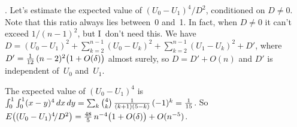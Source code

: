 \bigskip
{}.\quad
Let's estimate the expected value of $(U_0-U_1)^4\!/D^2$, conditioned on $D\neq
0$. Note that this ratio always lies between~0 and~1. In fact, when $D\neq 0$
 it can't exceed $1/(n-1)^2$, but I~don't need this. We have
$D=(U_0-U_1)^2+\sum_{k=2}^{n-1}(U_0-U_k)^2+\sum_{k=2}^{n-1}(U_1-U_k)^2+D'$,
where $D'={1\over 12}\,(n-2)^2\bigl(1+O(\delta)\bigr)$ almost surely, so
$D=D'+O(n)$ and $D'$ is independent of~$U_0$ and~$U_1$.

The expected value of $(U_0-U_1)^4$ is $\int_0^1\int_0^1(x-y)^4\,dx\,dy
=\sum_k{4\choose k}\,{1\over (k+1)(5-k)}\,(-1)^k={1\over 15}$. So
$E\big((U_0-U_1)^4\!/D^2\bigr)={48\over 5}\,n^{-4}\bigl(1+O(\delta)\bigr)
+O(n^{-5})$.

\bye


